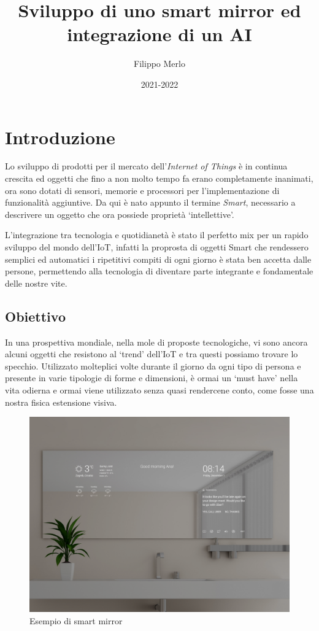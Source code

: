 \documentclass[12pt,a4paper]{article}
\title{Sviluppo di uno smart mirror ed integrazione di un AI}
\author{Filippo Merlo}
\date{2021-2022}
\begin{document}
\maketitle
\newpage
\tableofcontents
\newpage

\section{Introduzione}\label{introduzione}

Lo sviluppo di prodotti per il mercato dell'\textit{Internet of Things} \`e in
continua crescita ed oggetti che fino a non molto tempo fa erano completamente
inanimati, ora sono dotati di sensori, memorie e processori per l'implementazione
di funzionalit\`a aggiuntive. Da qui \`e nato appunto il termine \textit{Smart},
necessario a descrivere un oggetto che ora possiede propriet\`a `intellettive'.

L'integrazione tra tecnologia e quotidianet\`a \`e stato il perfetto mix per
un rapido sviluppo del mondo dell'IoT, infatti la proprosta di oggetti Smart che
rendessero semplici ed automatici i ripetitivi compiti di ogni giorno \`e stata
ben accetta dalle persone, permettendo alla tecnologia di diventare parte integrante
e fondamentale delle nostre vite.

\subsection{Obiettivo}\label{obiettivo}

In una prospettiva mondiale, nella mole di proposte tecnologiche, vi sono ancora
alcuni oggetti che resistono al `trend' dell'IoT e tra questi possiamo trovare lo
specchio. Utilizzato molteplici volte durante il giorno da ogni tipo di persona e
presente in varie tipologie di forme e dimensioni, \`e ormai un `must have' nella vita
odierna e ormai viene utilizzato senza quasi rendercene conto, come fosse una nostra
fisica estensione visiva.

\begin{figure}[t]
  \centering
  \includegraphics[width=\linewidth]{smart-mirror-example.png}
  \caption{Esempio di smart mirror}
  \label{smart-mirror-example}
\end{figure}
\end{document}
